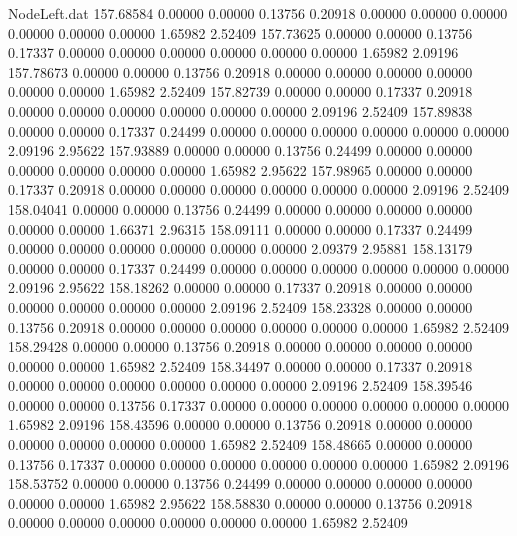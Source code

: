 \begin{filecontents}{NodeLeft.dat}
 157.68584    0.00000    0.00000     0.13756    0.20918    0.00000    0.00000    0.00000    0.00000    0.00000    0.00000    1.65982    2.52409
 157.73625    0.00000    0.00000     0.13756    0.17337    0.00000    0.00000    0.00000    0.00000    0.00000    0.00000    1.65982    2.09196
 157.78673    0.00000    0.00000     0.13756    0.20918    0.00000    0.00000    0.00000    0.00000    0.00000    0.00000    1.65982    2.52409
 157.82739    0.00000    0.00000     0.17337    0.20918    0.00000    0.00000    0.00000    0.00000    0.00000    0.00000    2.09196    2.52409
 157.89838    0.00000    0.00000     0.17337    0.24499    0.00000    0.00000    0.00000    0.00000    0.00000    0.00000    2.09196    2.95622
 157.93889    0.00000    0.00000     0.13756    0.24499    0.00000    0.00000    0.00000    0.00000    0.00000    0.00000    1.65982    2.95622
 157.98965    0.00000    0.00000     0.17337    0.20918    0.00000    0.00000    0.00000    0.00000    0.00000    0.00000    2.09196    2.52409
 158.04041    0.00000    0.00000     0.13756    0.24499    0.00000    0.00000    0.00000    0.00000    0.00000    0.00000    1.66371    2.96315
 158.09111    0.00000    0.00000     0.17337    0.24499    0.00000    0.00000    0.00000    0.00000    0.00000    0.00000    2.09379    2.95881
 158.13179    0.00000    0.00000     0.17337    0.24499    0.00000    0.00000    0.00000    0.00000    0.00000    0.00000    2.09196    2.95622
 158.18262    0.00000    0.00000     0.17337    0.20918    0.00000    0.00000    0.00000    0.00000    0.00000    0.00000    2.09196    2.52409
 158.23328    0.00000    0.00000     0.13756    0.20918    0.00000    0.00000    0.00000    0.00000    0.00000    0.00000    1.65982    2.52409
 158.29428    0.00000    0.00000     0.13756    0.20918    0.00000    0.00000    0.00000    0.00000    0.00000    0.00000    1.65982    2.52409
 158.34497    0.00000    0.00000     0.17337    0.20918    0.00000    0.00000    0.00000    0.00000    0.00000    0.00000    2.09196    2.52409
 158.39546    0.00000    0.00000     0.13756    0.17337    0.00000    0.00000    0.00000    0.00000    0.00000    0.00000    1.65982    2.09196
 158.43596    0.00000    0.00000     0.13756    0.20918    0.00000    0.00000    0.00000    0.00000    0.00000    0.00000    1.65982    2.52409
 158.48665    0.00000    0.00000     0.13756    0.17337    0.00000    0.00000    0.00000    0.00000    0.00000    0.00000    1.65982    2.09196
 158.53752    0.00000    0.00000     0.13756    0.24499    0.00000    0.00000    0.00000    0.00000    0.00000    0.00000    1.65982    2.95622
 158.58830    0.00000    0.00000     0.13756    0.20918    0.00000    0.00000    0.00000    0.00000    0.00000    0.00000    1.65982    2.52409

\end{filecontents}
